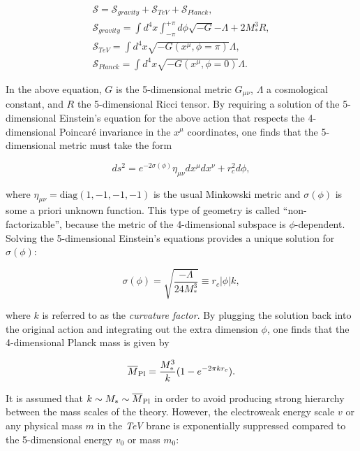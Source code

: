 \begin{equation}\label{eqn:WED_2}
\begin{gathered}
\mathcal{S} = \mathcal{S}_{gravity} + \mathcal{S}_{TeV} + \mathcal{S}_{Planck}, \\
\mathcal{S}_{gravity} = \int d^4x \int_{-\pi}^{+\pi} d\phi\sqrt{-G}{-\Lambda+2M^3_*R}, \\
\mathcal{S}_{TeV} = \int d^4x\sqrt{-G(x^\mu,\phi=\pi)}\Lambda, \\
\mathcal{S}_{Planck} = \int d^4x\sqrt{-G(x^\mu,\phi=0)}\Lambda.
\end{gathered}
\end{equation}

In the above equation, $G$ is the 5-dimensional metric $G_{\mu\nu}$, $\Lambda$ a cosmological constant, and $R$ the 5-dimensional Ricci tensor.
By requiring a solution of the 5-dimensional Einstein's equation for the above action that respects the 4-dimensional Poincar\'{e} invariance in the $x^\mu$ coordinates,
one finds that the 5-dimensional metric must take the form 

\begin{equation}\label{eqn:WED_3}
ds^2 = e^{-2\sigma(\phi)} \eta_{\mu\nu}dx^\mu dx^\nu + r^2_cd\phi,
\end{equation}

\noindent where $\eta_{\mu\nu} = \mathrm{diag}(1,-1,-1,-1)$ is the usual Minkowski metric and $\sigma(\phi)$ is some a priori unknown function.
This type of geometry is called ``non-factorizable'', because the metric of the 4-dimensional subspace is $\phi$-dependent.
Solving the 5-dimensional Einstein's equations provides a unique solution for $\sigma(\phi)$:

\begin{equation}\label{eqn:WED_4}
\sigma(\phi) = \sqrt{\frac{-\Lambda}{24M^3_*}} \equiv r_c|\phi|k,
\end{equation}

\noindent where $k$ is referred to as the \textit{curvature factor}.
By plugging the solution back into the original action and integrating out the extra dimension $\phi$, one finds that the 4-dimensional Planck mass is given by

\begin{equation}\label{eqn:WED_5}
\overline{M}_\mathrm{Pl} = \frac{M^3_*}{k}(1 - e^{-2\pi kr_c}).
\end{equation}

It is assumed that $k \sim M_* \sim \overline{M}_\mathrm{Pl}$ in order to avoid producing strong hierarchy between the mass scales of the theory.
However, the electroweak energy scale $v$ or any physical mass $m$ in the \textit{TeV} brane is exponentially suppressed compared to the 5-dimensional energy $v_0$ or mass $m_0$:

